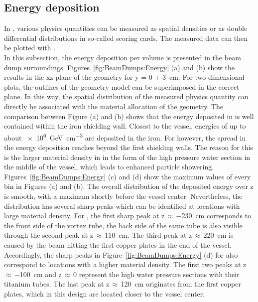 \subsection{Energy deposition}
\label{BeamDumps:sim_surrounding:Energy}
In \fluka, various physics quantities can be measured as spatial densities or as double differential distributions in so-called scoring cards.
The measured data can then be plotted with \flair.
\\In this subsection, the energy deposition per volume is presented in the beam dump surroundings.
Figures~\ref{fig:BeamDumps:Energy} (a) and (b) show the results in the xz-plane of the geometry for y = 0 $\pm$ \SI{3}{\centi\meter}.
For two dimensional plots, the outlines of the geometry model can be superimposed in the correct plane.
In this way, the spatial distribution of the measured physics quantity can directly be associated with the material allocation of the geometry.
The comparison between Figure (a) and (b) shows that the energy deposited in \designone is well contained within the iron shielding wall.
Closest to the vessel, energies of up to about \SI{e6}{\GeV\per\centi\meter\cubed} are deposited in the iron.
For \designtwo however, the spread in the energy deposition reaches beyond the first shielding walls.
The reason for this is the larger material density in \designtwo in the form of the high pressure water section in the middle of the vessel, which leads to enhanced particle showering.
\\Figures~\ref{fig:BeamDumps:Energy} (c) and (d) show the maximum values of every bin in Figures (a) and (b).
The overall distribution of the deposited energy over z is smooth, with a maximum shortly before the vessel center.
Nevertheless, the distribution has several sharp peaks which can be identified at locations with large material density.
For \designone, the first sharp peak at z\,$\approx$\,\SI{-230}{\centi\meter} corresponds to the front side of the vortex tube, the back side of the same tube is also visible through the second peak at z\,$\approx$\,\SI{110}{\centi\meter}.
The third peak at z\,$\approx$\,\SI{220}{\centi\meter} is caused by the beam hitting the first copper plates in the end of the vessel.
\\Accordingly, the sharp peaks in Figure~\ref{fig:BeamDumps:Energy} (d) for \designtwo also correspond to locations with a higher material density.
The first two peaks at z\,$\approx$\,\SI{-100}{\centi\meter} and z\,$\approx$\,0 represent the high water pressure sections with their titanium tubes.
The last peak at z\,$\approx$\,\SI{120}{\centi\meter} originates from the first copper plates, which in this design are located closer to the vessel center.

